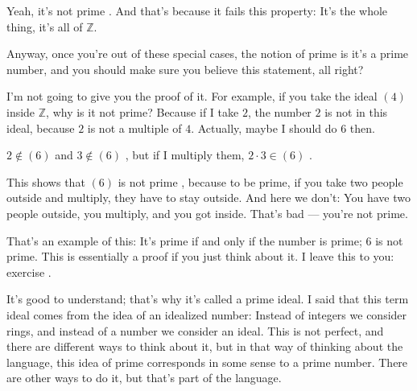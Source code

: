 \begin{speech}[00:51:37 - 00:53:20]
Yeah, it's not prime . And that's because it fails this property: It's the whole thing, it's all of $\mathbb{Z}$.

Anyway, once you're out of these special cases, the notion of prime is it's a prime number, and you should make sure you believe this statement, all right?

I'm not going to give you the proof of it. For example, if you take the ideal $(4)$ inside $\mathbb{Z}$, why is it not prime? Because if I take $2$, the number $2$ is not in this ideal, because $2$ is not a multiple of $4$. Actually, maybe I should do $6$ then. 

$2 \notin (6)$ and $3 \notin (6)$ , but if I multiply them, $2 \cdot 3 \in (6)$ .

This shows that $(6)$ is not prime , because to be prime, if you take two people outside and multiply, they have to stay outside. And here we don't: You have two people outside, you multiply, and you got inside. That's bad --- you're not prime.

That's an example of this: It's prime if and only if the number is prime; $6$ is not prime. This is essentially a proof if you just think about it. I leave this to you: exercise .

It's good to understand; that's why it's called a prime ideal. I said that this term ideal comes from the idea of an idealized number: Instead of integers we consider rings, and instead of a number we consider an ideal. This is not perfect, and there are different ways to think about it, but in that way of thinking about the language, this idea of prime corresponds in some sense to a prime number. There are other ways to do it, but that's part of the language.
\end{speech}

